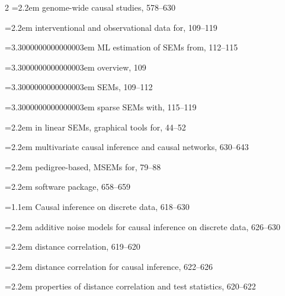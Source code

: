 \begin{multicols}{2}
\noindent\hangindent=2.2em \hspace*{1.1em}genome-wide causal studies, 578--630\par
\noindent\hangindent=2.2em \hspace*{1.1em}interventional and observational data for, 109--119\par
\noindent\hangindent=3.3000000000000003em \hspace*{2.2em}ML estimation of SEMs from, 112--115\par
\noindent\hangindent=3.3000000000000003em \hspace*{2.2em}overview, 109\par
\noindent\hangindent=3.3000000000000003em \hspace*{2.2em}SEMs, 109--112\par
\noindent\hangindent=3.3000000000000003em \hspace*{2.2em}sparse SEMs with, 115--119\par
\noindent\hangindent=2.2em \hspace*{1.1em}in linear SEMs, graphical tools for, 44--52\par
\noindent\hangindent=2.2em \hspace*{1.1em}multivariate causal inference and causal networks, 630--643\par
\noindent\hangindent=2.2em \hspace*{1.1em}pedigree-based, MSEMs for, 79--88\par
\noindent\hangindent=2.2em \hspace*{1.1em}software package, 658--659\par
\noindent\hangindent=1.1em Causal inference on discrete data, 618--630\par
\noindent\hangindent=2.2em \hspace*{1.1em}additive noise models for causal inference on discrete data, 626--630\par
\noindent\hangindent=2.2em \hspace*{1.1em}distance correlation, 619--620\par
\noindent\hangindent=2.2em \hspace*{1.1em}distance correlation for causal inference, 622--626\par
\noindent\hangindent=2.2em \hspace*{1.1em}properties of distance correlation and test statistics, 620--622\par

\end{multicols}

